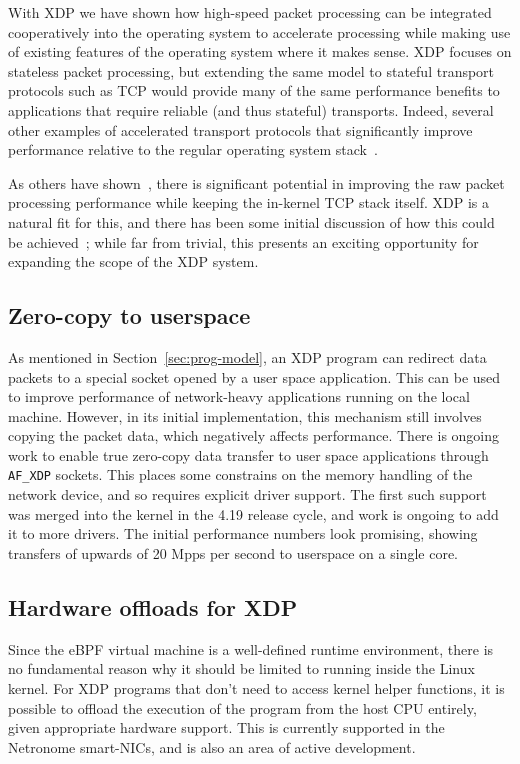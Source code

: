 \documentclass[sigconf]{acmart}
\begin{document}
With XDP we have shown how high-speed packet processing can be integrated
cooperatively into the operating system to accelerate processing while making
use of existing features of the operating system where it makes sense. XDP
focuses on stateless packet processing, but extending the same model to stateful
transport protocols such as TCP would provide many of the same performance
benefits to applications that require reliable (and thus stateful) transports.
Indeed, several other examples of accelerated transport protocols that
significantly improve performance relative to the regular operating system
stack~\cite{stackmap,sandstorm,belay2014ix,jeong2014mtcp}.

As others have shown~\cite{stackmap}, there is significant potential in
improving the raw packet processing performance while keeping the in-kernel TCP
stack itself. XDP is a natural fit for this, and there has been some initial
discussion of how this could be achieved~\cite{txdp}; while far from trivial,
this presents an exciting opportunity for expanding the scope of the XDP system.

\subsection{Zero-copy to userspace}
\label{sec:zero-copy-userspace}

As mentioned in Section~\ref{sec:prog-model}, an XDP program can redirect data
packets to a special socket opened by a user space application. This can be used
to improve performance of network-heavy applications running on the local
machine. However, in its initial implementation, this mechanism still involves
copying the packet data, which negatively affects performance. There is ongoing
work to enable true zero-copy data transfer to user space applications through
\texttt{AF\_XDP} sockets. This places some constrains on the memory handling of
the network device, and so requires explicit driver support. The first such
support was merged into the kernel in the 4.19 release cycle, and work is
ongoing to add it to more drivers. The initial performance numbers look
promising, showing transfers of upwards of 20 Mpps per second to userspace on a
single core.

\subsection{Hardware offloads for XDP}
\label{sec:hardw-offl-xdp}

Since the eBPF virtual machine is a well-defined runtime environment, there is
no fundamental reason why it should be limited to running inside the Linux
kernel. For XDP programs that don't need to access kernel helper functions, it
is possible to offload the execution of the program from the host CPU entirely,
given appropriate hardware support. This is currently supported in the
Netronome smart-NICs, and is also an area of active development.
\end{document}
